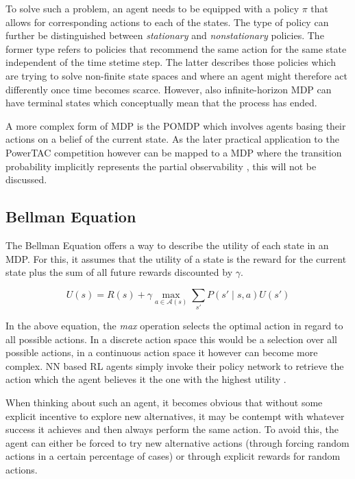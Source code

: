 To solve such a problem, an agent needs to be equipped with a policy $\pi$ that allows for corresponding actions to each
of the states. The type of policy can further be distinguished between \emph{stationary} and \emph{nonstationary}
policies. The former type refers to policies that recommend the same action for the same state independent of the
time stetime step. The latter describes those policies which are trying to solve non-finite state spaces and where an
agent might therefore act differently once time becomes scarce. However, also infinite-horizon \ac {MDP} can have
terminal states which conceptually mean that the process has ended.

A more complex form of \ac {MDP} is the \ac {POMDP} which involves agents basing their actions on a belief of the
current state. As the later practical application to the \ac {PowerTAC} competition however can be mapped to a \ac {MDP}
where the transition probability implicitly represents the partial observability \citep{tactexurieli2016mdp}, this will not be discussed. 

\subsection{Bellman Equation}%
\label{ssub:bellman_equation}

The Bellman Equation offers a way to describe the utility of each state in an \ac {MDP}. For this, it assumes that the
utility of a state is the reward for the current state plus the sum of all future rewards discounted by $\gamma$. 

\[
U(s) = R(s) + \gamma \max_{a\in\mathcal{A}(s)} \sum_{s'}{P(s' \mid s,a)U(s')}
\]

In the above equation, the \emph{max} operation selects the optimal action in regard to all possible actions. In a
discrete action space this would be a selection over all possible actions, in a continuous action space it however can
become more complex. \ac {NN} based \ac {RL} agents simply invoke their policy network to retrieve the action which the
agent believes it the one with the highest utility \citep{mnih2013playing}.



When thinking about such an agent, it becomes obvious that without some explicit incentive to explore new alternatives,
it may be contempt with whatever success it achieves and then always perform the same action. To avoid this, the agent
can either be forced to try new alternative actions (through forcing random actions in a certain percentage of cases) or
through explicit rewards for random actions.



